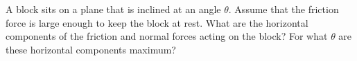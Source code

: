 A block sits on a plane that is inclined at an angle $\theta$. Assume that the friction force is large enough to keep the block at rest. What are the horizontal components of the friction and normal forces acting on the block? For what $\theta$ are these horizontal components maximum?
